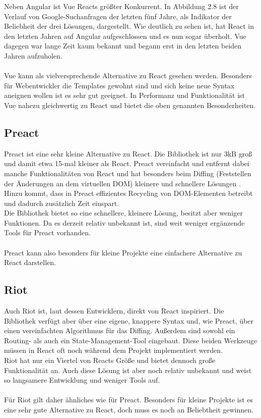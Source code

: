 Neben Angular ist Vue Reacts größter Konkurrent. In Abbildung 2.8 ist der Verlauf von Google-Suchanfragen der letzten fünf Jahre, als Indikator der Beliebheit der drei Lösungen, dargestellt. Wie deutlich zu sehen ist, hat React in den letzten Jahren auf Angular aufgeschlossen und es nun sogar überholt. Vue dagegen war lange Zeit kaum bekannt und begann erst in den letzten beiden Jahren aufzuholen.\\\\ 
Vue kann als vielversprechende Alternative zu React gesehen werden. Besonders für Webentwickler die Templates gewohnt sind und sich keine neue Syntax aneignen wollen ist es sehr gut geeignet. In Performanz und Funktionalität ist Vue nahezu gleichwertig zu React und bietet die oben genannten Besonderheiten.
\subsection{Preact}
Preact ist eine sehr kleine Alternative zu React. Die Bibliothek ist nur 3kB groß und damit etwa 15-mal kleiner als React. Preact vereinfacht und entfernt dabei manche Funktionalitäten von React und hat besonders beim Diffing (Feststellen der Änderungen an dem virtuellen DOM) kleinere und schnellere Lösungen \cite{9}. Hinzu kommt, dass in Preact effizientes Recycling von DOM-Elementen betreibt und dadurch zusätzlich Zeit einspart. \\
Die Bibliothek bietet so eine schnellere, kleinere Lösung, besitzt aber weniger Funktionen. Da es derzeit relativ unbekannt ist, sind weit weniger ergänzende Tools für Preact vorhanden. \\\\
Preact kann also besonders für kleine Projekte eine einfachere Alternative zu React darstellen.
\subsection{Riot}
Auch Riot ist, laut dessen Entwicklern, direkt von React inspiriert. Die Bibliothek verfügt aber über eine eigene, knappere Syntax und, wie Preact, über einen vereinfachten Algorithmus für das Diffing. Außerdem sind sowohl ein Routing- als auch ein State-Management-Tool eingebaut. Diese beiden Werkzeuge müssen in React oft noch während dem Projekt implementiert werden.\\
Riot hat nur ein Viertel von Reacts Größe und bietet dennoch große Funktionalität an. Auch diese Lösung ist aber noch relativ unbekannt und weist so langsamere Entwicklung und weniger Tools auf.\\\\
Für Riot gilt daher ähnliches wie für Preact. Besonders für kleine Projekte ist es eine sehr gute Alternative zu React, doch muss es noch an Beliebtheit gewinnen.
